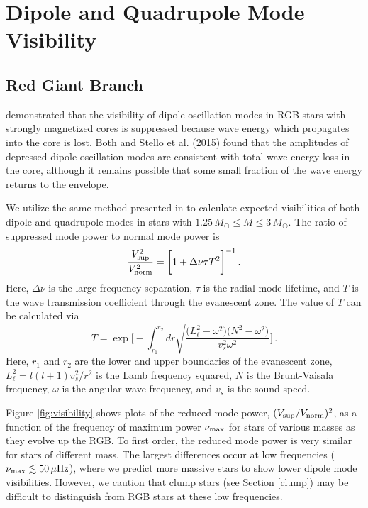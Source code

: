 \section{Dipole and Quadrupole Mode Visibility}


\subsection{Red Giant Branch}
\label{rgb}

\cite{Fuller_2015} demonstrated that the visibility of dipole oscillation modes in RGB stars with strongly magnetized cores is suppressed because wave energy which propagates into the core is lost. Both \cite{Fuller_2015} and Stello et al. (2015) found that the amplitudes of depressed dipole oscillation modes are consistent with total wave energy loss in the core, although it remains possible that some small fraction of the wave energy returns to the envelope.

We utilize the same method presented in \cite{Fuller_2015} to calculate expected visibilities of both dipole and quadrupole modes in stars with $1.25 \, M_\odot \leq M \leq 3 \, M_\odot$. The ratio of suppressed mode power to normal mode power is
\begin{equation}
\label{eqn:vsup}
\frac{V_{\rm sup}^2}{V_{\rm norm}^2} = \bigg[ 1 + \Delta \nu \tau T^2 \bigg]^{-1} \, .
\end{equation}
Here, $\Delta \nu$ is the large frequency separation, $\tau$ is the radial mode lifetime, and $T$ is the wave transmission coefficient through the evanescent zone. The value of $T$ can be calculated via
\begin{equation}
\label{eqn:T}
T  = \exp \bigg[ - \int^{r_2}_{r_1} dr \sqrt{ \frac{ \big( L_\ell^2 - \omega^2 \big) \big(N^2 - \omega^2 \big) }{v_s^2 \omega^2} } \bigg] \, .
\end{equation}
Here, $r_1$ and $r_2$ are the lower and upper boundaries of the evanescent zone, $L_\ell^2 = l(l+1)v_s^2/r^2$ is the Lamb frequency squared, $N$ is the Brunt-Vaisala frequency, $\omega$ is the angular wave frequency, and $v_s$ is the sound speed.
  
Figure \ref{fig:visibility} shows plots of the reduced mode power, $(V_{\rm sup}/V_{\rm norm})^2$, as a function of the frequency of maximum power $\nu_{\rm max}$ for stars of various masses as they evolve up the RGB. To first order, the reduced mode power is very similar for stars of different mass. The largest differences occur at low frequencies ($\nu_{\rm max} \lesssim 50 \, \mu {\rm Hz}$), where we predict more massive stars to show lower dipole mode visibilities. However, we caution that clump stars (see Section \ref{clump}) may be difficult to distinguish from RGB stars at these low frequencies.

